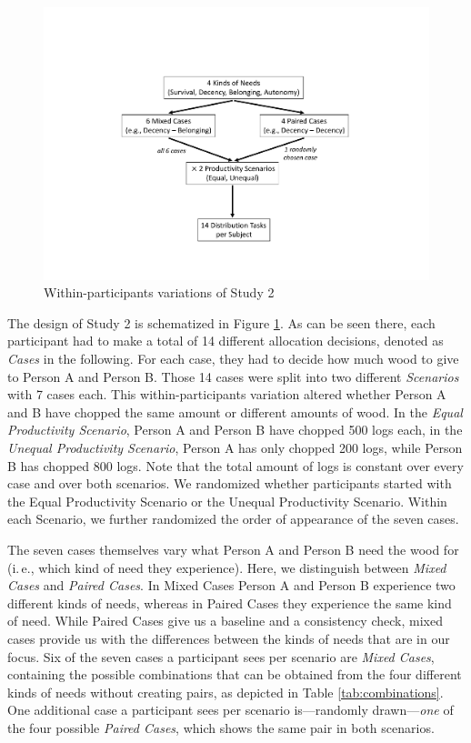\documentclass[egregdoesnotlikesansseriftitles]{scrartcl}
\begin{document}
\begin{figure}[t]
   \centering
   \includegraphics[width=1\linewidth]{figures/figure_3.pdf}
   \caption{Within-participants variations of Study 2}
   \label{fig:study_2_design}
\end{figure}

The design of Study 2 is schematized in Figure \ref{fig:study_2_design}.
As can be seen there, each participant had to make a total of 14 different allocation decisions, denoted as \textit{Cases} in the following.
For each case, they had to decide how much wood to give to Person A and Person B.
Those 14 cases were split into two different \textit{Scenarios} with 7 cases each.
This within-participants variation altered whether Person A and B have chopped the same amount or different amounts of wood.
In the \textit{Equal Productivity Scenario}, Person A and Person B have chopped 500 logs each, in the \textit{Unequal Productivity Scenario}, Person A has only chopped 200 logs, while Person B has chopped 800 logs.
Note that the total amount of logs is constant over every case and over both scenarios.
We randomized whether participants started with the Equal Productivity Scenario or the Unequal Productivity Scenario.
Within each Scenario, we further randomized the order of appearance of the seven cases.

The seven cases themselves vary what Person A and Person B need the wood for (i.\,e., which kind of need they experience).
Here, we distinguish between \textit{Mixed Cases} and \textit{Paired Cases}.
In Mixed Cases Person A and Person B experience two different kinds of needs, whereas in Paired Cases they experience the same kind of need.
While Paired Cases give us a baseline and a consistency check, mixed cases provide us with the differences between the kinds of needs that are in our focus.
Six of the seven cases a participant sees per scenario are \textit{Mixed Cases}, containing the possible combinations that can be obtained from the four different kinds of needs without creating pairs, as depicted in Table \ref{tab:combinations}.
One additional case a participant sees per scenario is---randomly drawn---\textit{one} of the four possible \textit{Paired Cases}, which shows the same pair in both scenarios.
\end{document}
